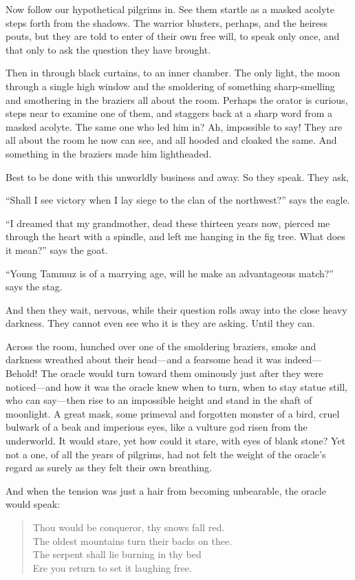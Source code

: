 Now follow our hypothetical pilgrims in. See them startle as a masked acolyte steps forth from the shadows. The warrior blusters, perhaps, and the heiress pouts, but they are told to enter of their own free will, to speak only once, and that only to ask the question they have brought.

Then in through black curtains, to an inner chamber. The only light, the moon through a single high window and the smoldering of something sharp-smelling and smothering in the braziers all about the room. Perhaps the orator is curious, steps near to examine one of them, and staggers back at a sharp word from a masked acolyte. The same one who led him in? Ah, impossible to say! They are all about the room he now can see, and all hooded and cloaked the same. And something in the braziers made him lightheaded.

Best to be done with this unworldly business and away. So they speak. They ask,

``Shall I see victory when I lay siege to the clan of the northwest?'' says the eagle.

``I dreamed that my grandmother, dead these thirteen years now, pierced me through the heart with a spindle, and left me hanging in the fig tree. What does it mean?'' says the goat.

``Young Tammuz is of a marrying age, will he make an advantageous match?'' says the stag.

And then they wait, nervous, while their question rolls away into the close heavy darkness. They cannot even see who it is they are asking. Until they can.

Across the room, hunched over one of the smoldering braziers, smoke and darkness wreathed about their head---and a fearsome head it was indeed---Behold! The oracle would turn toward them ominously just after they were noticed---and how it was the oracle knew when to turn, when to stay statue still, who can say---then rise to an impossible height and stand in the shaft of moonlight. A great mask, some primeval and forgotten monster of a bird, cruel bulwark of a beak and imperious eyes, like a vulture god risen from the underworld. It would stare, yet how could it stare, with eyes of blank stone? Yet not a one, of all the years of pilgrims, had not felt the weight of the oracle's regard as surely as they felt their own breathing.

And when the tension was just a hair from becoming unbearable, the oracle would speak:

\begin{verse}
Thou would be conqueror, thy snows fall red. \\
The oldest mountains turn their backs on thee. \\
The serpent shall lie burning in thy bed \\
Ere you return to set it laughing free.
\end{verse}\pagebreak

